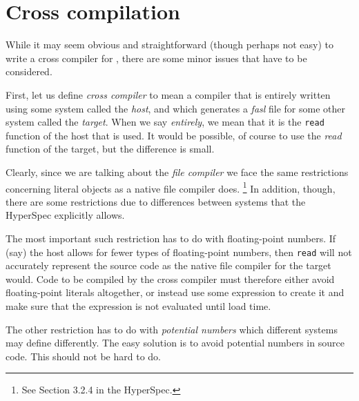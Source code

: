 \chapter{Cross compilation}
\label{chap-cross-compilation}

While it may seem obvious and straightforward (though perhaps not
easy) to write a cross compiler for \cl{}, there are some minor issues
that have to be considered. 

First, let us define \emph{cross compiler} to mean a compiler that is
entirely written using some \cl{} system called the \emph{host}, and
which generates a \emph{fasl} file for some other \cl{} system called
the \emph{target}.  When we say \emph{entirely}, we mean that it is
the \texttt{read} function of the host that is used.  It would be
possible, of course to use the \emph{read} function of the target, but
the difference is small.

Clearly, since we are talking about the \emph{file compiler} we face
the same restrictions concerning literal objects as a native file
compiler does.%
\footnote{See Section 3.2.4 in the HyperSpec.} %
In addition, though, there are some restrictions due to differences
between systems that the HyperSpec explicitly allows.  

The most important such restriction has to do with floating-point
numbers.  If (say) the host allows for fewer types of floating-point
numbers, then \texttt{read} will not accurately represent the source
code as the native file compiler for the target would.  Code to be
compiled by the cross compiler must therefore either avoid
floating-point literals altogether, or instead use some expression to
create it and make sure that the expression is not evaluated until
load time. 

The other restriction has to do with \emph{potential numbers} which
different systems may define differently.  The easy solution is to
avoid potential numbers in source code.  This should not be hard to
do. 


